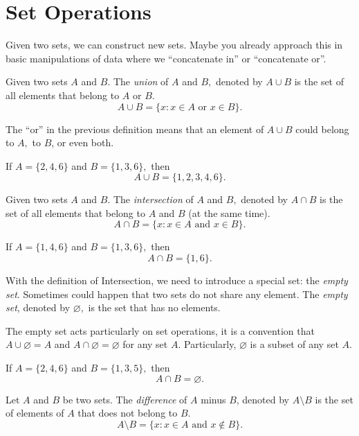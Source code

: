 \documentclass[
	fontsize=10pt, %
	twoside=false, %
	secnumdepth=1, %
]{kaobook}
\begin{document}
\section{Set Operations}

Given two sets, we can construct new sets. Maybe you already approach this in basic manipulations of data where we ``concatenate in'' or ``concatenate or''.


\begin{definition}[Union]
Given two sets $A$ and $B.$ The \emph{union} of $A$ and $B,$ denoted by $A\cup B$ is the set of all elements that belong to $A$ or $B.$ $$A\cup B=\{x: x\in A \mbox{ or }x\in B\}.$$
\end{definition}

The ``or'' in the previous definition means that an element of $A\cup B$ could belong to $A,$ to $B$, or even both.

\begin{example}
If $A=\{2,4,6\}$ and $B=\{1,3,6\},$ then $$A\cup B=\{1,2,3,4,6\}.$$
\end{example}

\begin{definition}[Intersection]
Given two sets $A$ and $B.$ The \emph{intersection} of $A$ and $B,$ denoted by $A\cap B$ is the set of all elements that belong to $A$ and $B$ (at the same time). $$A\cap B=\{x: x\in A \mbox{ and }x\in B\}.$$
\end{definition}

\begin{example}
If $A=\{1,4,6\}$ and $B=\{1,3,6\},$ then $$A\cap B=\{1,6\}.$$
\end{example}

With the definition of Intersection, we need to introduce a special set: the \emph{empty set}. Sometimes could happen that two sets do not share any element. The \emph{empty set}, denoted by $\varnothing,$ is the set that has no elements.

The empty set acts particularly on set operations, it is a convention that $A\cup \varnothing =A$ and $A\cap \varnothing= \varnothing$ for any set $A.$ Particularly, $\varnothing$ is a subset of any set $A.$


\begin{example}
If $A=\{2,4,6\}$ and $B=\{1,3,5\},$ then $$A\cap B=\varnothing.$$
\end{example}

\begin{definition}[Difference]
Let $A$ and $B$ be two sets. The \emph{difference} of $A$ minus $B$, denoted by $A\setminus B$ is the set of elements of $A$ that does not belong to $B.$ $$A\setminus B=\{x: x\in A\mbox{ and }x\not\in B \}.$$
\end{definition}
\end{document}
